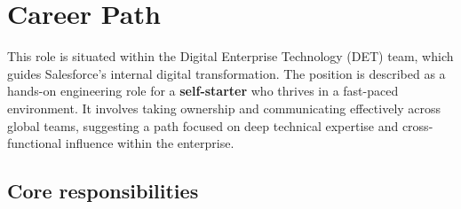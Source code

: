 \documentclass[11pt]{article}
\begin{document}
\section*{Career Path}
This role is situated within the Digital Enterprise Technology (DET) team, 
which guides Salesforce's internal digital transformation. The position is 
described as a hands-on engineering role for a \textbf{self-starter} who 
thrives in a fast-paced environment. It involves taking ownership and 
communicating effectively across global teams, suggesting a path focused on 
deep technical expertise and cross-functional influence within the enterprise.

\newpage
\subsection*{Core responsibilities}
\end{document}
